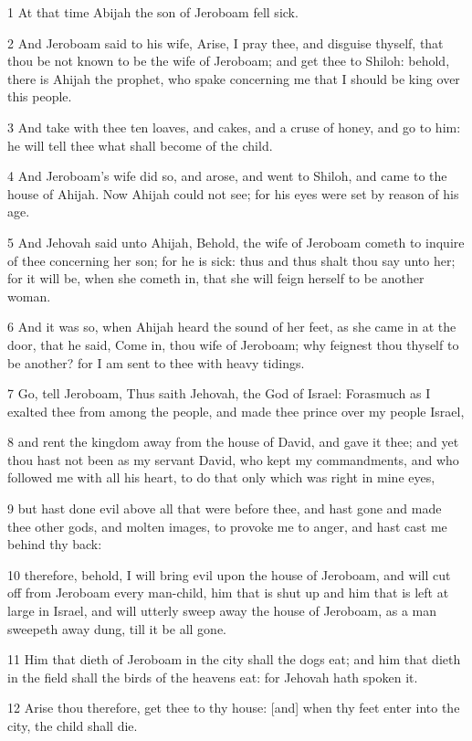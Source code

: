 \par 1 At that time Abijah the son of Jeroboam fell sick.
\par 2 And Jeroboam said to his wife, Arise, I pray thee, and disguise thyself, that thou be not known to be the wife of Jeroboam; and get thee to Shiloh: behold, there is Ahijah the prophet, who spake concerning me that I should be king over this people.
\par 3 And take with thee ten loaves, and cakes, and a cruse of honey, and go to him: he will tell thee what shall become of the child.
\par 4 And Jeroboam's wife did so, and arose, and went to Shiloh, and came to the house of Ahijah. Now Ahijah could not see; for his eyes were set by reason of his age.
\par 5 And Jehovah said unto Ahijah, Behold, the wife of Jeroboam cometh to inquire of thee concerning her son; for he is sick: thus and thus shalt thou say unto her; for it will be, when she cometh in, that she will feign herself to be another woman.
\par 6 And it was so, when Ahijah heard the sound of her feet, as she came in at the door, that he said, Come in, thou wife of Jeroboam; why feignest thou thyself to be another? for I am sent to thee with heavy tidings.
\par 7 Go, tell Jeroboam, Thus saith Jehovah, the God of Israel: Forasmuch as I exalted thee from among the people, and made thee prince over my people Israel,
\par 8 and rent the kingdom away from the house of David, and gave it thee; and yet thou hast not been as my servant David, who kept my commandments, and who followed me with all his heart, to do that only which was right in mine eyes,
\par 9 but hast done evil above all that were before thee, and hast gone and made thee other gods, and molten images, to provoke me to anger, and hast cast me behind thy back:
\par 10 therefore, behold, I will bring evil upon the house of Jeroboam, and will cut off from Jeroboam every man-child, him that is shut up and him that is left at large in Israel, and will utterly sweep away the house of Jeroboam, as a man sweepeth away dung, till it be all gone.
\par 11 Him that dieth of Jeroboam in the city shall the dogs eat; and him that dieth in the field shall the birds of the heavens eat: for Jehovah hath spoken it.
\par 12 Arise thou therefore, get thee to thy house: [and] when thy feet enter into the city, the child shall die.
